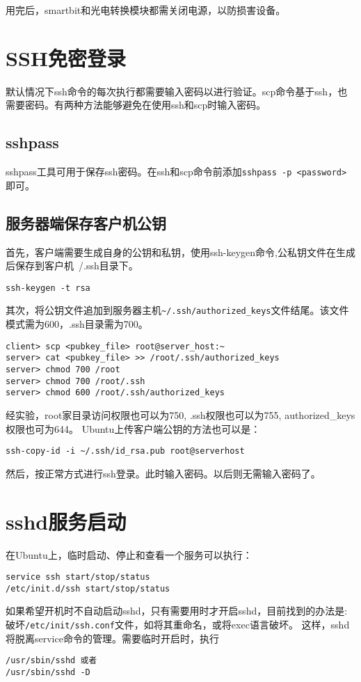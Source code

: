 用完后，smartbit和光电转换模块都需关闭电源，以防损害设备。




\section{SSH免密登录}
默认情况下ssh命令的每次执行都需要输入密码以进行验证。scp命令基于ssh，也需要密码。有两种方法能够避免在使用ssh和scp时输入密码。

\subsection{sshpass}
sshpass工具可用于保存ssh密码。在ssh和scp命令前添加\verb+sshpass -p <password>+即可。

\subsection{服务器端保存客户机公钥}
首先，客户端需要生成自身的公钥和私钥，使用ssh-keygen命令,公私钥文件在生成后保存到客户机~/.ssh目录下。
\begin{verbatim}
ssh-keygen -t rsa
\end{verbatim}

其次，将公钥文件追加到服务器主机\verb+~/.ssh/authorized_keys+文件结尾。该文件模式需为600，.ssh目录需为700。
\begin{verbatim}
client> scp <pubkey_file> root@server_host:~
server> cat <pubkey_file> >> /root/.ssh/authorized_keys
server> chmod 700 /root
server> chmod 700 /root/.ssh
server> chmod 600 /root/.ssh/authorized_keys
\end{verbatim}
经实验，root家目录访问权限也可以为750, .ssh权限也可以为755, authorized\_keys权限也可为644。
Ubuntu上传客户端公钥的方法也可以是：
\begin{verbatim}
ssh-copy-id -i ~/.ssh/id_rsa.pub root@serverhost
\end{verbatim}


然后，按正常方式进行ssh登录。此时输入密码。以后则无需输入密码了。

\section{sshd服务启动}
在Ubuntu上，临时启动、停止和查看一个服务可以执行：
\begin{verbatim}
service ssh start/stop/status
/etc/init.d/ssh start/stop/status
\end{verbatim}

如果希望开机时不自动启动sshd，只有需要用时才开启sshd，目前找到的办法是:破坏\verb+/etc/init/ssh.conf+文件，如将其重命名，或将exec语言破坏。
这样，sshd将脱离service命令的管理。需要临时开启时，执行
\begin{verbatim}
/usr/sbin/sshd 或者
/usr/sbin/sshd -D
\end{verbatim}

